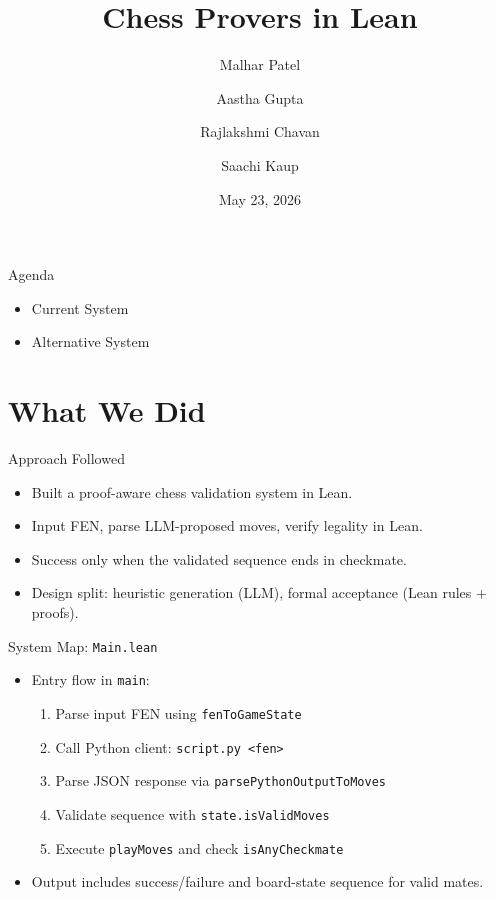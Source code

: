 \documentclass{beamer}
\title{Chess Provers in Lean}
\author{Malhar Patel \and Aastha Gupta \and Rajlakshmi Chavan \and Saachi Kaup}
\date{May 23, 2026}
\begin{document}
\begin{frame}
  \titlepage
\end{frame}

\begin{frame}{Agenda}
\begin{itemize}
  \item Current System
  \vspace{0.8cm}
  \item Alternative System
\end{itemize}
\end{frame}

\section{What We Did}

\begin{frame}{Approach Followed}
\begin{itemize}
  \item Built a proof-aware chess validation system in Lean.
  \item Input FEN, parse LLM-proposed moves, verify legality in Lean.
  \item Success only when the validated sequence ends in checkmate.
  \item Design split: heuristic generation (LLM), formal acceptance (Lean rules + proofs).
\end{itemize}
\end{frame}

\begin{frame}{System Map: \texttt{Main.lean}}
\begin{itemize}
  \item Entry flow in \texttt{main}:
  \begin{enumerate}
    \item Parse input FEN using \texttt{fenToGameState}
    \item Call Python client: \texttt{script.py <fen>}
    \item Parse JSON response via \texttt{parsePythonOutputToMoves}
    \item Validate sequence with \texttt{state.isValidMoves}
    \item Execute \texttt{playMoves} and check \texttt{isAnyCheckmate}
  \end{enumerate}
  \item Output includes success/failure and board-state sequence for valid mates.
\end{itemize}
\end{frame}
\end{document}
